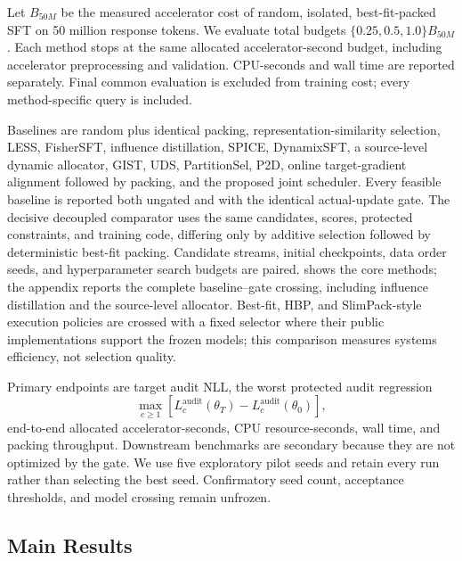 \documentclass{article}
\begin{document}
Let $B_{50M}$ be the measured accelerator cost of random, isolated,
best-fit-packed SFT on 50 million response tokens. We evaluate total budgets
$\{0.25,0.5,1.0\}B_{50M}$. Each method stops at the same allocated
accelerator-second budget, including accelerator preprocessing and validation.
CPU-seconds and wall time are reported separately. Final common evaluation is
excluded from training cost; every method-specific query is included.

Baselines are random plus identical packing, representation-similarity
selection, LESS, FisherSFT, influence distillation, SPICE, DynamixSFT, a
source-level dynamic allocator, GIST, UDS, PartitionSel, P2D, online
target-gradient alignment followed by packing, and the proposed joint
scheduler. Every feasible baseline is reported
both ungated and with the identical actual-update gate. The decisive decoupled
comparator uses the same candidates, scores, protected constraints, and
training code, differing only by additive selection followed by deterministic
best-fit packing. Candidate streams, initial checkpoints, data order seeds, and
hyperparameter search budgets are paired.  shows the core
methods; the appendix reports the complete baseline--gate crossing, including
influence distillation and the source-level allocator.
Best-fit, HBP, and SlimPack-style execution policies are crossed with a fixed
selector where their public implementations support the frozen models; this
comparison measures systems efficiency, not selection quality.

Primary endpoints are target audit NLL, the worst protected audit regression
\begin{equation}
\max_{c\ge1}
\left[L_c^{\mathrm{audit}}(\theta_T)-
L_c^{\mathrm{audit}}(\theta_0)\right],
\end{equation}
end-to-end allocated accelerator-seconds, CPU resource-seconds, wall time, and
packing throughput. Downstream benchmarks
are secondary because they are not optimized by the gate. We use five
exploratory pilot seeds and retain every run rather than selecting the best
seed. Confirmatory seed count, acceptance thresholds, and model crossing
remain unfrozen.

\subsection{Main Results}
\end{document}
